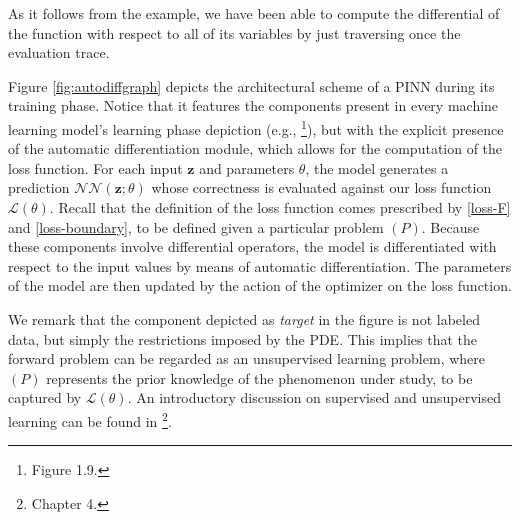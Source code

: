\documentclass[12pt]{report} %
\newcommand{\tmmathbf}[1]{\ensuremath{\boldsymbol{#1}}}
\begin{document}
As it follows from the example, we have been able to compute the differential of the function with respect to all of its variables by just traversing once the evaluation trace. 

Figure \ref{fig:autodiffgraph} depicts the architectural scheme of a PINN during its training phase. Notice that it features the components present in every machine learning model's learning phase depiction (e.g., \cite{chollet2021deep}\footnote{Figure 1.9.}), but with the explicit presence of the automatic differentiation module, which allows for the computation of the loss function. For each input $\tmmathbf{z}$ and parameters $\theta$, the model generates a prediction $\mathcal{NN}(\tmmathbf{z};\theta)$ whose correctness is evaluated against our loss function $\mathcal{L}(\theta)$. Recall that the definition of the loss function comes prescribed by \eqref{loss-F} and \eqref{loss-boundary}, to be defined given a particular problem $(P)$. Because these components involve differential operators, the model is differentiated with respect to the input values by means of automatic differentiation. The parameters of the model are then updated by the action of the optimizer on the loss function. %

We remark that the component depicted as \textit{target} in the figure is not labeled data, but simply the restrictions imposed by the PDE. This implies that the forward problem can be regarded as an unsupervised learning problem, where $(P)$ represents the prior knowledge of the phenomenon under study, to be captured by $\mathcal{L}(\theta)$. An introductory discussion on supervised and unsupervised learning can be found in \cite{chollet2021deep}\footnote{Chapter 4.}.
\end{document}
